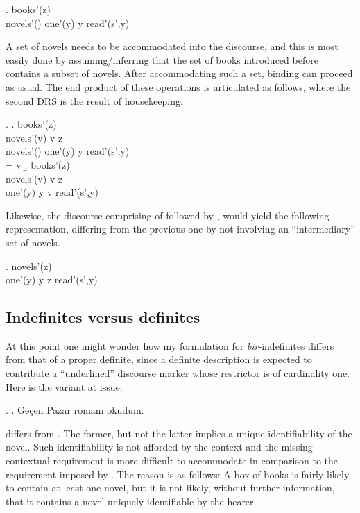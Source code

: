 \documentclass[11pt,a4paper]{article}
\begin{document}
\ex. 
{
books'(z)\\
novels'() \quad one'(y) \quad y \subseteq {} \quad read'(s',y)
}

A set of novels needs to be accommodated into the discourse, and
this is most easily done by assuming/inferring that the set of books
introduced before contains a subset of novels. After accommodating
such a set, binding can proceed as usual. The end product of these
operations is articulated as follows, where the second DRS is the
result of housekeeping.

\ex.
\a.
{
books'(z)\\
novels'(v) \quad v \subseteq z\\
novels'() \quad one'(y) \quad y \subseteq {} \quad read'(s',y)\\
 = v
}
\b.
{
books'(z)\\
novels'(v) \quad v \subseteq z\\
one'(y) \quad y \subseteq v \quad read'(s',y)
}



Likewise, the discourse comprising of
 followed by , would yield
the following representation, differing from the previous one by not
involving an ``intermediary'' set of novels.

\ex.
{
novels'(z)\\
one'(y) \quad y \subseteq z \quad read'(s',y)
}

\subsection{Indefinites versus definites}

At this point one might wonder how my formulation for
\emph{bir}-indefinites differs from that of a proper definite, since a
definite description is expected to contribute a ``underlined''
discourse marker whose restrictor is of cardinality one. Here is the
variant at issue:

\ex.\label{exromandef}
\a. Geçen Pazar romanı okudum.


 differs from . The former, but
not the latter implies a unique identifiability of the novel. Such
identifiability is not afforded by the context and the missing
contextual requirement is more difficult to accommodate in comparison
to the requirement imposed by  . The reason is as
follows: A box of books is fairly likely to contain at least one
novel, but it is not likely, without further information, that it
contains a novel uniquely identifiable by the hearer.
\end{document}
